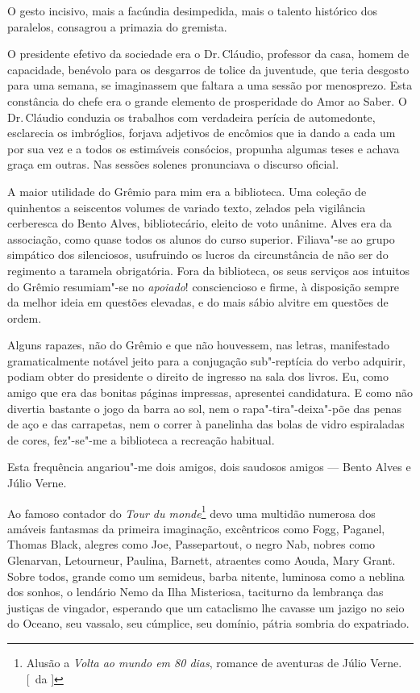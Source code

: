 
O gesto incisivo,
mais a facúndia desimpedida, mais o talento histórico dos paralelos,
consagrou a primazia do gremista. 

O presidente efetivo da sociedade era
o Dr.\,Cláudio, professor da casa, homem de capacidade, benévolo para os
desgarros de tolice da juventude, que teria desgosto para uma semana,
se imaginassem que faltara a uma sessão por menosprezo. Esta constância
do chefe era o grande elemento de prosperidade do Amor ao Saber. 
O Dr.\,Cláudio conduzia os trabalhos com verdadeira perícia de automedonte,
esclarecia os imbróglios, forjava adjetivos de encômios que ia dando a
cada um por sua vez e a todos os estimáveis consócios, propunha algumas
teses e achava graça em outras. Nas sessões solenes pronunciava o
discurso oficial. 

A maior utilidade do Grêmio para mim era a
biblioteca. Uma coleção de quinhentos a seiscentos volumes de variado
texto, zelados pela vigilância cerberesca do Bento Alves,
bibliotecário, eleito de voto unânime. Alves era da associação, como
quase todos os alunos do curso superior. Filiava"-se ao grupo
simpático dos silenciosos, usufruindo os lucros da circunstância de não
ser do regimento a taramela obrigatória. Fora da biblioteca, os seus
serviços aos intuitos do Grêmio resumiam"-se no \textit{apoiado}! consciencioso
e firme, à disposição sempre da melhor ideia em questões elevadas, e do
mais sábio alvitre em questões de ordem. 

Alguns rapazes, não do Grêmio
e que não houvessem, nas letras, manifestado gramaticalmente notável
jeito para a conjugação sub"-reptícia do verbo adquirir, podiam obter
do presidente o direito de ingresso na sala dos livros. Eu, como amigo
que era das bonitas páginas impressas, apresentei candidatura. E como
não divertia bastante o jogo da barra ao sol, nem o
rapa"-tira"-deixa"-põe das penas de aço e das carrapetas, nem o
correr à panelinha das bolas de vidro espiraladas de cores, fez"-se"-me
a biblioteca a recreação habitual. 

Esta frequência angariou"-me dois
amigos, dois saudosos amigos --- Bento Alves e Júlio Verne. 

Ao famoso contador do \textit{Tour du monde}\footnote{ Alusão a \textit{Volta ao mundo em 80 dias}, 
romance de aventuras de Júlio Verne. [~da ]} devo uma multidão numerosa dos amáveis
fantasmas da primeira imaginação, excêntricos como Fogg, Paganel,
Thomas Black, alegres como Joe, Passepartout, o negro Nab, nobres como
Glenarvan, Letourneur, Paulina, Barnett, atraentes como Aouda, Mary
Grant. Sobre todos, grande como um semideus, barba nitente, luminosa
como a neblina dos sonhos, o lendário Nemo da Ilha Misteriosa,
taciturno da lembrança das justiças de vingador, esperando que um
cataclismo lhe cavasse um jazigo no seio do Oceano, seu vassalo, seu
cúmplice, seu domínio, pátria sombria do expatriado.

